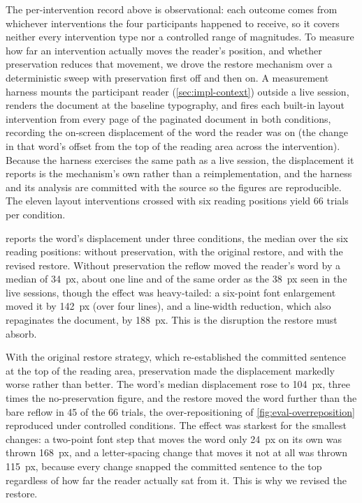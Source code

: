 The per-intervention record above is observational: each outcome comes from whichever interventions the four participants happened to receive, so it covers neither every intervention type nor a controlled range of magnitudes.
To measure how far an intervention actually moves the reader's position, and whether preservation reduces that movement, we drove the restore mechanism over a deterministic sweep with preservation first off and then on.
A measurement harness mounts the participant reader (\cref{sec:impl-context}) outside a live session, renders the document at the baseline typography, and fires each built-in layout intervention from every page of the paginated document in both conditions, recording the on-screen displacement of the word the reader was on (the change in that word's offset from the top of the reading area across the intervention).
Because the harness exercises the same  path as a live session, the displacement it reports is the mechanism's own rather than a reimplementation, and the harness and its analysis are committed with the source so the figures are reproducible.
The eleven layout interventions crossed with six reading positions yield 66 trials per condition.

 reports the word's displacement under three conditions, the median over the six reading positions: without preservation, with the original restore, and with the revised restore.
Without preservation the reflow moved the reader's word by a median of \SI{34}{px}, about one line and of the same order as the \SI{38}{px} seen in the live sessions, though the effect was heavy-tailed: a six-point font enlargement moved it by \SI{142}{px} (over four lines), and a line-width reduction, which also repaginates the document, by \SI{188}{px}.
This is the disruption the restore must absorb.

With the original restore strategy, which re-established the committed sentence at the top of the reading area, preservation made the displacement markedly worse rather than better.
The word's median displacement rose to \SI{104}{px}, three times the no-preservation figure, and the restore moved the word further than the bare reflow in 45 of the 66 trials, the over-repositioning of \cref{fig:eval-overreposition} reproduced under controlled conditions.
The effect was starkest for the smallest changes: a two-point font step that moves the word only \SI{24}{px} on its own was thrown \SI{168}{px}, and a letter-spacing change that moves it not at all was thrown \SI{115}{px}, because every change snapped the committed sentence to the top regardless of how far the reader actually sat from it.
This is why we revised the restore.

